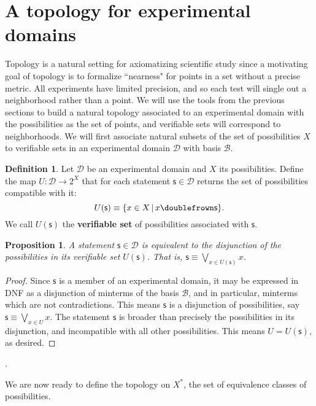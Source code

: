 \documentclass[psamsfonts]{amsart}
\newtheorem{prop}[thm]{Proposition}
\theoremstyle{definition}
\newtheorem{defn}[thm]{Definition}
\theoremstyle{remark}
\numberwithin{equation}{section}
\def\comp{\doublefrown}
\def\bigOR{\bigvee}
\newcommand{\stmt}[1][s] {\mathsf{#1}}
\newcommand{\obs}[1][s] {\mathsf{#1}}
\newcommand{\edomain}[1][D] {\mathcal{#1}}
\newcommand{\basis}[1][B] {\mathcal{#1}} %
\begin{document}
\section{A topology for experimental domains}

Topology is a natural setting for axiomatizing scientific study since a motivating goal of topology is to formalize ``nearness" for points in a set without a precise metric. All experiments have limited precision, and so each test will single out a neighborhood rather than a point. We will use the tools from the previous sections to build a natural topology associated to an experimental domain with the possibilities as the set of points, and verifiable sets will correspond to neighborhoods. We will first associate natural subsets of the set of possibilities $X$ to verifiable sets in an experimental domain $\edomain$ with basis $\basis$. 


\begin{defn}
	Let $\edomain$ be an experimental domain and $X$ its possibilities. Define the map $U : \edomain \rightarrow 2^X$ that for each statement $\obs \in \edomain$ returns the set of possibilities compatible with it: $$U(\obs)\equiv\{ x \in X \, | \, x \comp \obs\}.$$ We call $U(\obs)$ the \textbf{verifiable set} of possibilities associated with $\obs$.
\end{defn}

\begin{prop}
	A statement $\obs \in \edomain$ is equivalent to the disjunction of the possibilities in its verifiable set $U(\obs)$. That is, $\obs \equiv \bigOR\limits_{x \in U(\obs)} x$.
\end{prop}
\begin{proof}
Since $\stmt$ is a member of an experimental domain, it may be expressed in DNF as a disjunction of minterms of the basis $\basis$, and in particular, minterms which are not contradictions. This means $\stmt$ is a disjunction of possibilities, say $\stmt\equiv\bigOR\limits_{x \in U} x$. The statement $\stmt$ is broader than precisely the possibilities in its disjunction, and incompatible with all other possibilities. This means $U=U(\stmt)$, as desired. 
\end{proof}. 

We are now ready to define the topology on $X^*$, the set of equivalence classes of possibilities. 
\end{document}
